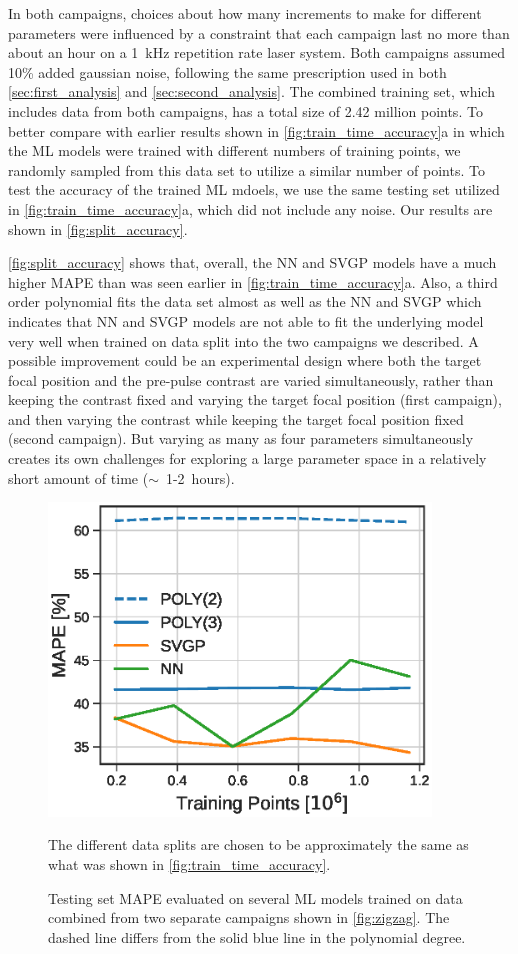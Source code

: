 In both campaigns, choices about how many increments to make for different parameters were influenced by a constraint that each campaign last no more than about an hour on a 1~kHz repetition rate laser system. Both campaigns assumed 10\% added gaussian noise, following the same prescription used in both \autoref{sec:first_analysis} and \autoref{sec:second_analysis}. The combined training set, which includes data from both campaigns, has a total size of 2.42 million points. To better compare with earlier results shown in \autoref{fig:train_time_accuracy}a in which the ML models were trained with different numbers of training points, we randomly sampled from this data set to utilize a similar number of points. To test the accuracy of the trained \gls{ML} mdoels, we use the same testing set utilized in \autoref{fig:train_time_accuracy}a, which did not include any noise. Our results are shown in \autoref{fig:split_accuracy}. 

\autoref{fig:split_accuracy} shows that, overall, the \gls{NN} and \gls{SVGP} models have a much higher \gls{MAPE} than was seen earlier in \autoref{fig:train_time_accuracy}a. Also, a third order polynomial fits the data set almost as well as the NN and SVGP which indicates that NN and SVGP models are not able to fit the underlying model very well when trained on data split into the two campaigns we described. A possible improvement could be an experimental design where both the target focal position and the pre-pulse contrast are varied simultaneously, rather than keeping the contrast fixed and varying the target focal position (first campaign), and then varying the contrast while keeping the target focal position fixed (second campaign). But varying as many as four parameters simultaneously creates its own challenges for exploring a large parameter space in a relatively short amount of time ($\sim$~1-2~hours).

\begin{figure}
	\centering
	\includegraphics[width=4in]{planning/images/paper2/fig11.eps}
	\caption{Testing set MAPE evaluated on several ML models trained on data combined from two separate campaigns shown in \autoref{fig:zigzag}. The dashed line differs from the solid blue line in the polynomial degree.} The different data splits are chosen to be approximately the same as what was shown in \autoref{fig:train_time_accuracy}.
	\label{fig:split_accuracy}
\end{figure}

